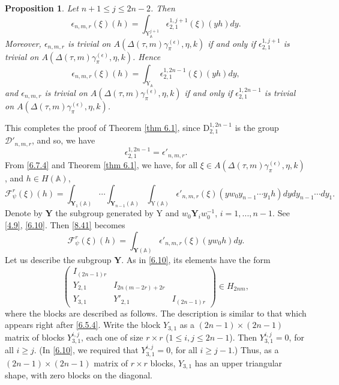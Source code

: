 \documentclass[12pts]{amsart}
\newcommand{\BA}{{\mathbb {A}}}
\newtheorem{prop}[thm]{Proposition}
\begin{document}
\begin{prop}\label{prop 8.8}
	Let $n+1\leq j\leq 2n-2$. Then 
\begin{equation}\label{8.39}
\epsilon_{n,m,r}(\xi)(h)=\int_{\mathrm{Y}^{j+1}_\BA}\epsilon_{2,1}^{1,j+1}(\xi)(yh)dy.
\end{equation}	
Moreover, $\epsilon_{n,m,r}$ is trivial on $A(\Delta(\tau,m)\gamma_\pi^{(\epsilon)},\eta,k)$ if and only if $\epsilon_{2,1}^{1,j+1}$ is trivial on $A(\Delta(\tau,m)\gamma_\pi^{(\epsilon)},\eta,k)$. Hence
\begin{equation}\label{8.40}
\epsilon_{n,m,r}(\xi)(h)=\int_{\mathrm{Y}_\BA}\epsilon_{2,1}^{1,2n-1}(\xi)(yh)dy,
\end{equation}
and	$\epsilon_{n,m,r}$ is trivial on $A(\Delta(\tau,m)\gamma_\pi^{(\epsilon)},\eta,k)$ if and only if $\epsilon_{2,1}^{1,2n-1}$ is trivial on $A(\Delta(\tau,m)\gamma_\pi^{(\epsilon)},\eta,k)$. 
\end{prop}
This completes the proof of Theorem \ref{thm 6.1}, since
$\mathrm{D}_{2,1}^{1,2n-1}$ is the group $\mathcal{D}'_{n,m,r}$, and
so, we have
$$
\epsilon_{2,1}^{1,2n-1}=\epsilon'_{n,m,r}.
$$
From \eqref{6.7.4} and Theorem \ref{thm 6.1}, we have, for all $\xi\in A(\Delta(\tau,m)\gamma_\pi^{(\epsilon)},\eta,k)$, and $h\in H(\BA)$,
\begin{equation}\label{8.41}
\mathcal{F}_\psi^r(\xi)(h)=\int_{\mathbf{Y}_1(\BA)}\cdots \int_{\mathbf{Y}_{n-1}(\BA)}\int_{\mathrm{Y}(\BA)}\epsilon'_{n,m,r}(\xi)(yw_0y_{n-1}\cdots y_1h)dydy_{n-1}\cdots dy_1.
\end{equation}
Denote by $\mathbf{Y}$ the subgroup generated by $\mathrm{Y}$ and $w_0\mathbf{Y}_iw_0^{-1}$, $i=1,...,n-1$. See \eqref{4.9}, \eqref{6.10}. Then \eqref{8.41} becomes
\begin{equation}\label{8.42}
\mathcal{F}_\psi^r(\xi)(h)=\int_{\mathbf{Y}(\BA)}\epsilon'_{n,m,r}(\xi)(yw_0h)dy.
\end{equation}
Let us describe the subgroup $\mathbf{Y}$. As in \eqref{6.10}, its elements have the form
\begin{equation}\label{8.43}
\begin{pmatrix}I_{(2n-1)r}\\Y_{2,1}&I_{2n(m-2r)+2r}\\
Y_{3,1}&Y'_{2,1}&I_{(2n-1)r}\end{pmatrix}\in H_{2nm},
\end{equation}
where the blocks are described as follows. The description is similar to that which appears right after \eqref{6.5.4}. Write the block $Y_{3,1}$ as a $(2n-1)\times (2n-1)$ matrix of blocks
$Y_{3,1}^{i,j}$, each one of size $r\times r$ ($1\leq i,j\leq
2n-1$). Then $Y_{3,1}^{i,j}=0$, for all $i\geq j$. (In \eqref{6.10}, we required that $Y_{3,1}^{i,j}=0$, for all $i\geq j-1$.) Thus, as a
$(2n-1)\times (2n-1)$ matrix of $r\times r$ blocks, $Y_{3,1}$ has an
upper triangular shape, with zero blocks on the diagonal.
\end{document}
